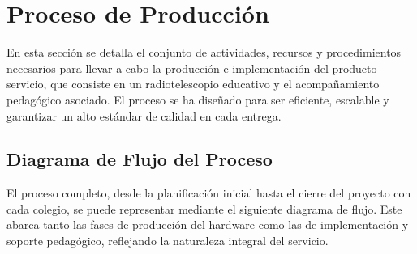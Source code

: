 \section{Proceso de Producción}

En esta sección se detalla el conjunto de actividades, recursos y
procedimientos necesarios para llevar a cabo la producción e implementación
del producto-servicio, que consiste en un radiotelescopio educativo y el
acompañamiento pedagógico asociado. El proceso se ha diseñado para ser
eficiente, escalable y garantizar un alto estándar de calidad en cada
entrega.

\subsection{Diagrama de Flujo del Proceso}

El proceso completo, desde la planificación inicial hasta el cierre del
proyecto con cada colegio, se puede representar mediante el siguiente
diagrama de flujo. Este abarca tanto las fases de producción del hardware
como las de implementación y soporte pedagógico, reflejando la naturaleza
integral del servicio.

